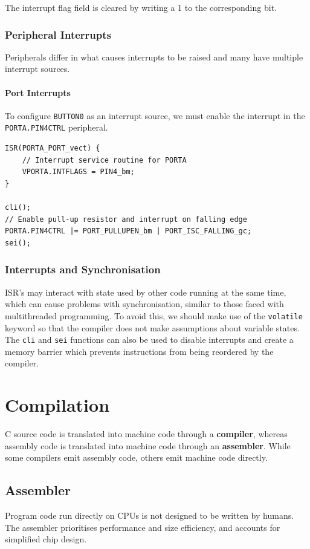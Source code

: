 \documentclass[a4paper]{report}
\begin{document}
The interrupt flag field is cleared by writing a 1 to the corresponding bit.
\subsection{Peripheral Interrupts}
Peripherals differ in what causes interrupts to be raised and many have multiple interrupt sources.
\subsubsection{Port Interrupts}
To configure \texttt{BUTTON0} as an interrupt source, we must enable the interrupt in the \texttt{PORTA.PIN4CTRL} peripheral.
\begin{verbatim}
ISR(PORTA_PORT_vect) {
    // Interrupt service routine for PORTA
    VPORTA.INTFLAGS = PIN4_bm;
}

cli();
// Enable pull-up resistor and interrupt on falling edge
PORTA.PIN4CTRL |= PORT_PULLUPEN_bm | PORT_ISC_FALLING_gc;
sei();
\end{verbatim}
\subsection{Interrupts and Synchronisation}
ISR's may interact with state used by other code running at the same time,
which can cause problems with synchronisation, similar to those faced with multithreaded programming.
To avoid this, we should make use of the \texttt{volatile} keyword
so that the compiler does not make assumptions about variable states.
The \texttt{cli} and \texttt{sei} functions can also be used to disable interrupts
and create a memory barrier which prevents instructions from being reordered by the compiler.
\chapter{Compilation}
C source code is translated into machine code through a \textbf{compiler}, whereas
assembly code is translated into machine code through an \textbf{assembler}.
While some compilers emit assembly code, others emit machine code directly.
\section{Assembler}
Program code run directly on CPUs is not designed to be written by humans.
The assembler prioritises performance and size efficiency, and accounts for
simplified chip design.
\end{document}
